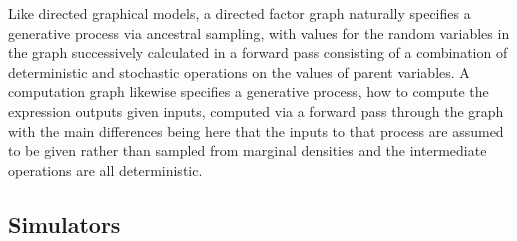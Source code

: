 
Like directed graphical models, a directed factor graph naturally specifies a generative process via ancestral sampling, with values for the random variables in the graph successively calculated in a forward pass consisting of a combination of deterministic and stochastic operations on the values of parent variables. A computation graph likewise specifies a generative process, how to compute the expression outputs given inputs, computed via a forward pass through the graph with the main differences being here that the inputs to that process are assumed to be given rather than sampled from marginal densities and the intermediate operations are all deterministic.

\subsection{Simulators}\label{subsec:simulators}

